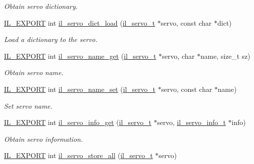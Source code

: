 \begin{DoxyCompactItemize}
\begin{DoxyCompactList}\small\item\em Obtain servo dictionary. \end{DoxyCompactList}\item 
\hyperlink{common_8h_a6bb629d26c52bfe10519ba3176853f47}{I\+L\+\_\+\+E\+X\+P\+O\+RT} int \hyperlink{group__IL__SERVO_ga5598b379a48c330d7c76ffb109088403}{il\+\_\+servo\+\_\+dict\+\_\+load} (\hyperlink{group__IL__SERVO_ga3369ddfcc33492fe3a28f96cf455b13e}{il\+\_\+servo\+\_\+t} $\ast$servo, const char $\ast$dict)
\begin{DoxyCompactList}\small\item\em Load a dictionary to the servo. \end{DoxyCompactList}\item 
\hyperlink{common_8h_a6bb629d26c52bfe10519ba3176853f47}{I\+L\+\_\+\+E\+X\+P\+O\+RT} int \hyperlink{group__IL__SERVO_ga4154f5f19c2826449c4e01021a9fa061}{il\+\_\+servo\+\_\+name\+\_\+get} (\hyperlink{group__IL__SERVO_ga3369ddfcc33492fe3a28f96cf455b13e}{il\+\_\+servo\+\_\+t} $\ast$servo, char $\ast$name, size\+\_\+t sz)
\begin{DoxyCompactList}\small\item\em Obtain servo name. \end{DoxyCompactList}\item 
\hyperlink{common_8h_a6bb629d26c52bfe10519ba3176853f47}{I\+L\+\_\+\+E\+X\+P\+O\+RT} int \hyperlink{group__IL__SERVO_gadd8ffb5ac5efa38c62e2d480f4c90475}{il\+\_\+servo\+\_\+name\+\_\+set} (\hyperlink{group__IL__SERVO_ga3369ddfcc33492fe3a28f96cf455b13e}{il\+\_\+servo\+\_\+t} $\ast$servo, const char $\ast$name)
\begin{DoxyCompactList}\small\item\em Set servo name. \end{DoxyCompactList}\item 
\hyperlink{common_8h_a6bb629d26c52bfe10519ba3176853f47}{I\+L\+\_\+\+E\+X\+P\+O\+RT} int \hyperlink{group__IL__SERVO_gac10a7958e9f2c4ef31ba2df3d7b51168}{il\+\_\+servo\+\_\+info\+\_\+get} (\hyperlink{group__IL__SERVO_ga3369ddfcc33492fe3a28f96cf455b13e}{il\+\_\+servo\+\_\+t} $\ast$servo, \hyperlink{structil__servo__info__t}{il\+\_\+servo\+\_\+info\+\_\+t} $\ast$info)
\begin{DoxyCompactList}\small\item\em Obtain servo information. \end{DoxyCompactList}\item 
\hyperlink{common_8h_a6bb629d26c52bfe10519ba3176853f47}{I\+L\+\_\+\+E\+X\+P\+O\+RT} int \hyperlink{group__IL__SERVO_gab2f6c3652bfea0818a2087434c5d4f6b}{il\+\_\+servo\+\_\+store\+\_\+all} (\hyperlink{group__IL__SERVO_ga3369ddfcc33492fe3a28f96cf455b13e}{il\+\_\+servo\+\_\+t} $\ast$servo)

\end{DoxyCompactItemize}

